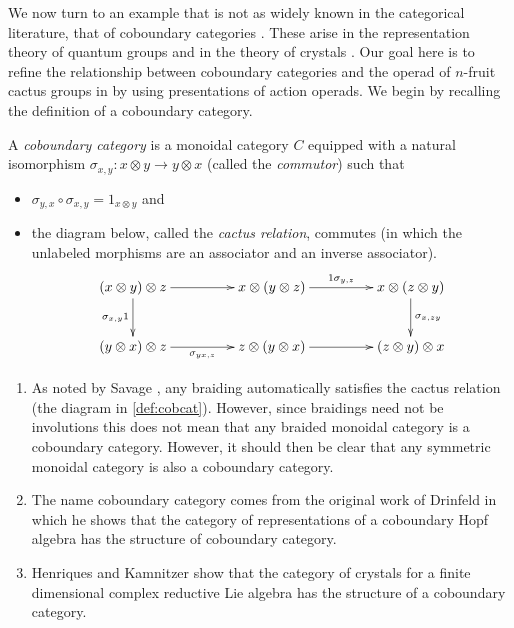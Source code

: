 We now turn to an example that is not as widely known in the categorical literature, that of coboundary categories \cite{drin-quasihopf}. These arise in the representation theory of quantum groups and in the theory of crystals \cite{hk-cobound, hk-quantum}. Our goal here is to refine the relationship between coboundary categories and the operad of $n$-fruit cactus groups in \cite{hk-cobound} by using presentations of action operads. We begin by recalling the definition of a coboundary category.


\begin{Defi}\label{def:cobcat}
A \textit{coboundary category} is a monoidal category $C$ equipped with a natural isomorphism $\sigma_{x,y} \colon x \otimes y \rightarrow y \otimes x$ (called the \textit{commutor}) such that
\begin{itemize}
\item $\sigma_{y,x} \circ \sigma_{x,y} = 1_{x \otimes y}$ and
\item the diagram below, called the \emph{cactus relation}, commutes (in which the unlabeled morphisms are an associator and an inverse associator).
  \[
    \xy
      (0,0)*+{(x \otimes y) \otimes z} ="00";
      (35,0)*+{x \otimes (y \otimes z)} ="10";
      (70,0)*+{x \otimes (z \otimes y)} ="20";
      (0,-15)*+{(y \otimes x) \otimes z} ="01";
      (35,-15)*+{z \otimes (y \otimes x)} ="11";
      (70,-15)*+{(z \otimes y )\otimes x} ="21";
      {\ar "00"; "10" };
      {\ar^{1 \sigma_{y,z}} "10"; "20" };
      {\ar^{\sigma_{x,zy}} "20"; "21" };
      {\ar_{\sigma_{x,y}1} "00"; "01" };
      {\ar_{\sigma_{yx,z}} "01"; "11" };
      {\ar "11"; "21" };
    \endxy
  \]
\end{itemize}
\end{Defi}

\begin{example}\label{ex:cobcats}
\begin{enumerate}
\item As noted by Savage \cite{savage-braidcob}, any braiding automatically satisfies the cactus relation (the diagram in \cref{def:cobcat}). However, since braidings need not be involutions this does not mean that any braided monoidal category is a coboundary category. However, it should then be clear that any symmetric monoidal category is also a coboundary category.
\item The name coboundary category comes from the original work of Drinfeld \cite{drin-quasihopf} in which he shows that the category of representations of a coboundary Hopf algebra has the structure of coboundary category.
\item Henriques and Kamnitzer \cite{hk-cobound} show that the category of crystals for a finite dimensional complex reductive Lie algebra has the structure of a coboundary category. 
\end{enumerate}
\end{example}

